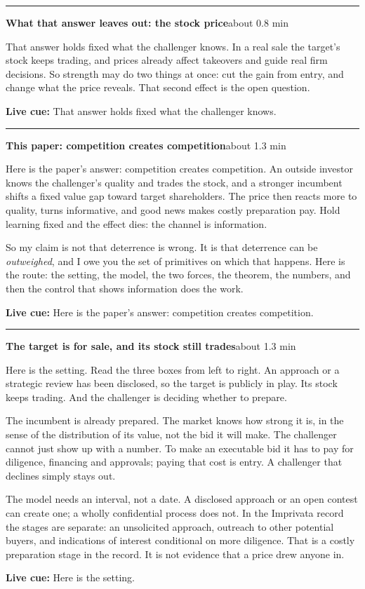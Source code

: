 \documentclass[11pt]{article}
\newcommand{\Cue}[1]{\par\nobreak\smallskip\noindent
  \textcolor{ScriptGray}{\footnotesize\textbf{Live cue:} #1}\par}
\newcommand{\scriptframe}[3]{%
  \Needspace{9\baselineskip}%
  \par\medskip\noindent\textcolor{ScriptBlue}{\rule{\linewidth}{0.55pt}}%
  \par\smallskip\noindent
  \textbf{#1}\hfill\textcolor{ScriptGray}{\small #2}\par\smallskip
  #3\par}
\begin{document}
\scriptframe{What that answer leaves out: the stock price}{about 0.8 min}{%
  That answer holds fixed what the challenger knows. In a real sale the
  target's stock keeps trading, and prices already affect takeovers and guide
  real firm decisions. So strength may do two things at once: cut the gain
  from entry, and change what the price reveals. That second effect is the
  open question.
  \Cue{That answer holds fixed what the challenger knows.}
}

\scriptframe{This paper: competition creates competition}{about 1.3 min}{%
  Here is the paper's answer: competition creates competition. An outside
  investor knows the challenger's quality and trades the stock, and a stronger
  incumbent shifts a fixed value gap toward target shareholders. The price then
  reacts more to quality, turns informative, and good news makes costly
  preparation pay. Hold learning fixed and the effect dies: the channel is
  information.

  So my claim is not that deterrence is wrong. It is that deterrence can be
  \emph{outweighed}, and I owe you the set of primitives on which that happens.
  Here is the route: the setting, the model, the two forces, the theorem, the
  numbers, and then the control that shows information does the work.
  \Cue{Here is the paper's answer: competition creates competition.}
}

\scriptframe{The target is for sale, and its stock still trades}{about 1.3 min}{%
  Here is the setting. Read the three boxes from left to right. An approach or
  a strategic review has been disclosed, so the target is publicly in play.
  Its stock keeps trading. And the challenger is deciding whether to prepare.

  The incumbent is already prepared. The market knows how strong it is, in the
  sense of the distribution of its value, not the bid it will make. The
  challenger cannot just show up with a number. To make an executable bid it
  has to pay for diligence, financing and approvals; paying that cost is entry.
  A challenger that declines simply stays out.

  The model needs an interval, not a date. A disclosed approach or an open
  contest can create one; a wholly confidential process does not. In the
  Imprivata record the stages are separate: an unsolicited approach, outreach
  to other potential buyers, and indications of interest conditional on more
  diligence. That is a costly preparation stage in the record. It is not
  evidence that a price drew anyone in.
  \Cue{Here is the setting.}
}
\end{document}
